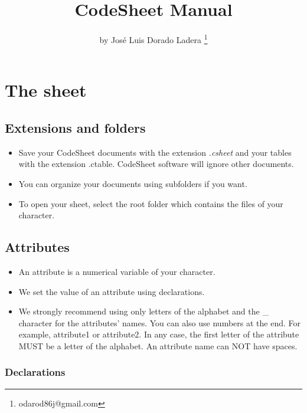 \documentclass[11pt,a4paper,openright,oneside]{book}
\title{\Huge CodeSheet Manual}
\author{by Jos\'e Luis Dorado Ladera \thanks{odarod86j@gmail.com} }
\begin{document}
\maketitle
\tableofcontents

\chapter{The sheet}

\section{Extensions and folders}

\begin{itemize}
\item
Save your CodeSheet documents with the extension \textit{.csheet} and your tables with the extension \textsf{.ctable}. 
CodeSheet software will ignore other documents. 
\item
You can organize your documents using subfolders if you want. 
\item
To open your sheet, select the root folder which contains the files of your character.
\end{itemize}

\section{Attributes}

\begin{itemize}
\item
An attribute is a numerical variable of your character. 
\item
We set the value of an attribute using declarations.
\item
We strongly recommend using only letters of the alphabet and the \textsf{\_} character for the attributes' names. You can also use numbers at the end. For example, \textsf{attribute1} or \textsf{attribute2}. In any case, the first letter of the attribute MUST be a letter of the alphabet. An attribute name can NOT have spaces.
\end{itemize}

\subsection{Declarations}
\end{document}
